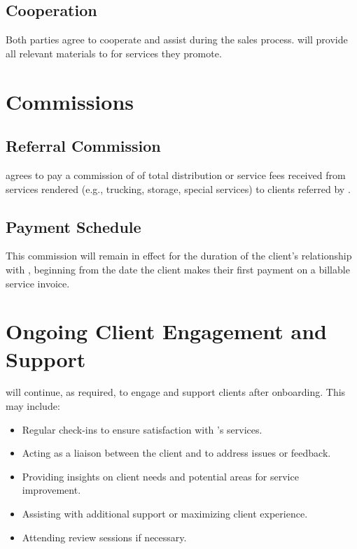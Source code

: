\documentclass[12pt]{article}
\begin{document}
\subsection{Cooperation}
Both parties agree to cooperate and assist during the sales process.  
\partyBshort{} will provide all relevant materials to \partyAshort{} for services they promote.

\section{Commissions}
\label{sec:commissions}

\subsection{Referral Commission}
\partyBshort{} agrees to pay \partyAshort{} a commission of \commissionRate{} of total distribution or service fees received from services rendered (e.g., trucking, storage, special services) to clients referred by \partyAshort{}.

\subsection{Payment Schedule}
This commission will remain in effect for the duration of the client’s relationship with \textbf{\partyBshort}, beginning from the date the client makes their first payment on a billable service invoice.

\section{Ongoing Client Engagement and Support}
\partyAshort{} will continue, as required, to engage and support clients after onboarding. This may include:
\begin{itemize}
  \item Regular check-ins to ensure satisfaction with \partyBshort{}’s services.
  \item Acting as a liaison between the client and \partyBshort{} to address issues or feedback.
  \item Providing insights on client needs and potential areas for service improvement.
  \item Assisting with additional support or maximizing client experience.
  \item Attending review sessions if necessary.
\end{itemize}
\end{document}
